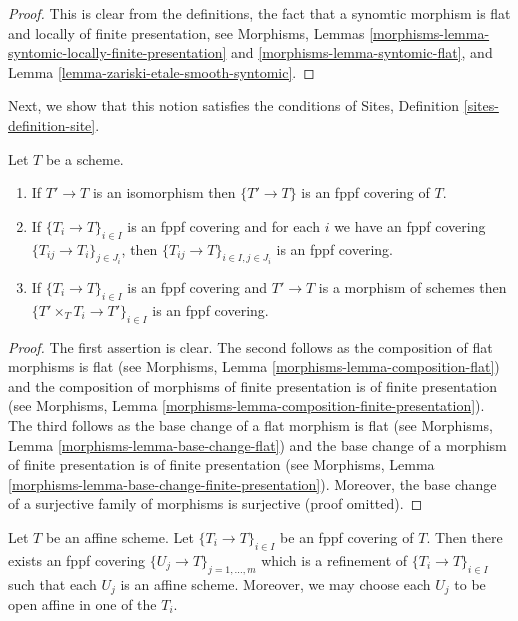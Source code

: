 \begin{proof}
This is clear from the definitions, the fact that a synomtic morphism
is flat and locally of finite presentation, see
Morphisms, Lemmas
\ref{morphisms-lemma-syntomic-locally-finite-presentation} and
\ref{morphisms-lemma-syntomic-flat},
and
Lemma \ref{lemma-zariski-etale-smooth-syntomic}.
\end{proof}

\noindent
Next, we show that this notion satisfies the conditions of
Sites, Definition \ref{sites-definition-site}.

\begin{lemma}
\label{lemma-fppf}
Let $T$ be a scheme.
\begin{enumerate}
\item If $T' \to T$ is an isomorphism then $\{T' \to T\}$
is an fppf covering of $T$.
\item If $\{T_i \to T\}_{i\in I}$ is an fppf covering and for each
$i$ we have an fppf covering $\{T_{ij} \to T_i\}_{j\in J_i}$, then
$\{T_{ij} \to T\}_{i \in I, j\in J_i}$ is an fppf covering.
\item If $\{T_i \to T\}_{i\in I}$ is an fppf covering
and $T' \to T$ is a morphism of schemes then
$\{T' \times_T T_i \to T'\}_{i\in I}$ is an fppf covering.
\end{enumerate}
\end{lemma}

\begin{proof}
The first assertion is clear.
The second follows as the composition of flat morphisms is flat
(see Morphisms, Lemma \ref{morphisms-lemma-composition-flat})
and the composition of morphisms of finite presentation is
of finite presentation
(see Morphisms, Lemma \ref{morphisms-lemma-composition-finite-presentation}).
The third follows as the base change of a flat morphism is flat
(see Morphisms, Lemma \ref{morphisms-lemma-base-change-flat})
and the base change of a morphism of finite presentation is
of finite presentation
(see Morphisms, Lemma \ref{morphisms-lemma-base-change-finite-presentation}).
Moreover, the base change of a surjective family of morphisms is surjective
(proof omitted).
\end{proof}

\begin{lemma}
\label{lemma-fppf-affine}
Let $T$ be an affine scheme.
Let $\{T_i \to T\}_{i \in I}$ be an fppf covering of $T$.
Then there exists an fppf covering
$\{U_j \to T\}_{j = 1, \ldots, m}$ which is a refinement
of $\{T_i \to T\}_{i \in I}$ such that each $U_j$ is an affine
scheme. Moreover, we may choose each $U_j$ to be open affine
in one of the $T_i$.
\end{lemma}

